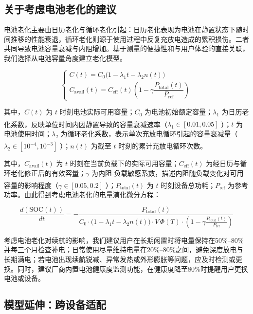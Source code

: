 \documentclass{mcmthesis}  %
\newcommand{\upcite}[1]{\textsuperscript{\textsuperscript{\cite{#1}}}}
\begin{document}
	
	\subsection{关于考虑电池老化的建议}
	
	电池老化主要由日历老化与循环老化引起：日历老化表现为电池在静置状态下随时间推移的性能衰退，循环老化则源于使用过程中反复充放电造成的累积损伤。二者共同导致电池容量衰减与内阻增加。基于测量的便捷性和与用户体验的直接关联，我们选择从电池容量角度建立老化模型。
	
	\begin{equation}
		\begin{cases}
			C(t) = C_0\bigl(1 - \lambda_1 t - \lambda_2 n(t)\bigr) \\[8pt]
			C_{\text{avail}}(t) = C_{\text{eff}}(t) \left(1 - \gamma \dfrac{P_{\text{total}}(t)}{P_{\text{ref}}}\right)
		\end{cases}
	\end{equation}
	
	其中，$C(t)$ 为 $t$ 时刻电池实际可用容量；$C_0$ 为电池初始额定容量；$\lambda_1$ 为日历老化系数，反映单位时间内因静置导致的容量衰减速率（$\lambda_1\in [0.01,0.05]$ \upcite{9}）；$t$ 为电池使用时间；$\lambda_2$ 为循环老化系数，表示单次充放电循环引起的容量衰减量（$\lambda_2\in [10^{-4},10^{-3}]$ \upcite{10}）；$n(t)$ 为截至 $t$ 时刻的累计充放电循环次数。
	
	其中，$C_{\text{avail}}(t)$ 为 $t$ 时刻在当前负载下的实际可用容量；$C_{\text{eff}}(t)$ 为经日历与循环老化修正后的有效容量；$\gamma$ 为内阻-负载敏感系数，描述内阻随负载变化对可用容量的影响程度（$\gamma\in [0.05,0.2]$ \upcite{11}）；$P_{\text{total}}(t)$ 为 $t$ 时刻设备总功耗；$P_{\text{ref}}$ 为参考功率。由此得到考虑电池老化的电量演化微分方程：
	
	\begin{equation}
		\frac{d \left(\text{SOC}(t)\right)}{dt} = - \frac{P_{\text{total}}(t)}{C_0 \cdot \bigl(1 - \lambda_1 t - \lambda_2 n(t)\bigr) \cdot V \, \Phi(T) \cdot \left(1 - \gamma \frac{P_{\text{total}}(t)}{P_{\text{ref}}}\right)}
	\end{equation}
	
	考虑电池老化对续航的影响，我们建议用户在长期闲置时将电量保持在50\%--80\%并每三个月检查补电；日常使用尽量维持电量在20\%--80\%之间，避免深度放电与长期满电；若电池出现续航锐减、异常发热或外形膨胀等问题，应及时检测或更换。同时，建议厂商内置电池健康度监测功能，在健康度降至80\%时提醒用户更换电池或设备。
	
	
	\subsection{模型延伸：跨设备适配}
	
\end{document}
